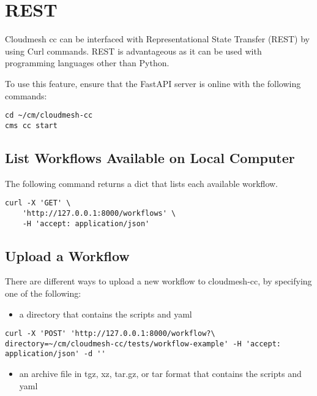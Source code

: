 
\section{REST}\label{rest}

Cloudmesh cc can be interfaced with Representational State Transfer
(REST) by using Curl commands. REST is advantageous as it can be used
with programming languages other than Python.

To use this feature, ensure that the FastAPI server is online with the
following commands:

\begin{verbatim}
cd ~/cm/cloudmesh-cc
cms cc start
\end{verbatim}

\subsection{List Workflows Available on Local
Computer}\label{list-workflows-available-on-local-computer}

The following command returns a dict that lists each available workflow.

\begin{verbatim}
curl -X 'GET' \
    'http://127.0.0.1:8000/workflows' \
    -H 'accept: application/json'
\end{verbatim}

\subsection{Upload a Workflow}\label{upload-a-workflow}

There are different ways to upload a new workflow to cloudmesh-cc, by
specifying one of the following:

\bigbreak
\begin{itemize}
\item
  a directory that contains the scripts and yaml
\end{itemize}

\begin{verbatim}
curl -X 'POST' 'http://127.0.0.1:8000/workflow?\
directory=~/cm/cloudmesh-cc/tests/workflow-example' -H 'accept: application/json' -d ''
\end{verbatim}
\bigbreak

\bigbreak
\begin{itemize}
\item
  an archive file in tgz, xz, tar.gz, or tar format that contains the
  scripts and yaml
\end{itemize}


